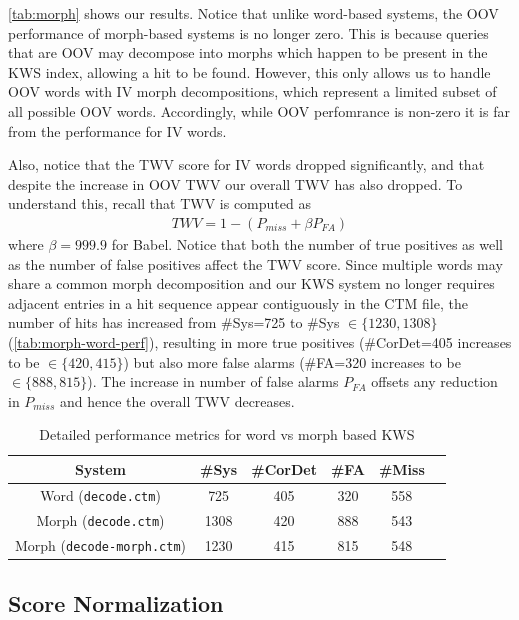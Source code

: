 \documentclass[a4paper,oneside,reqno]{amsart}
\begin{document}
\autoref{tab:morph} shows our results. Notice that unlike word-based systems,
the OOV performance of morph-based systems is no longer zero. This is because
queries that are OOV may decompose into morphs which happen to be present
in the KWS index, allowing a hit to be found. However, this only allows us to
handle OOV words with IV morph decompositions, which represent a limited subset
of all possible OOV words. Accordingly, while OOV perfomrance is non-zero it is
far from the performance for IV words.

Also, notice that the TWV score for IV words dropped significantly, and that
despite the increase in OOV TWV our overall TWV has also dropped. To understand
this, recall that TWV is computed as
\begin{align}
  \label{def:twv}
  TWV = 1 - (P_{miss} + \beta P_{FA})
\end{align}
where $\beta = 999.9$ for Babel. Notice that both the number of true positives
as well as the number of false positives affect the TWV score. Since multiple
words may share a common morph decomposition and our KWS system no longer
requires adjacent entries in a hit sequence appear contiguously in the CTM
file, the number of hits has increased from \#Sys=725 to \#Sys $\in \{1230,
1308\}$ (\autoref{tab:morph-word-perf}), resulting in more true positives
(\#CorDet=405 increases to be $\in \{420, 415\}$) but also more false alarms
(\#FA=320 increases to be $\in \{888, 815\}$). The increase in number of false
alarms $P_{FA}$ offsets any reduction in $P_{miss}$ and hence the overall TWV
decreases.

\begin{table}
  \begin{tabular}{cccccc}
    \toprule
    System                            & \#Sys & \#CorDet & \#FA & \#Miss\\
    \midrule
    Word (\texttt{decode.ctm})        & 725   & 405      & 320  & 558\\
    Morph (\texttt{decode.ctm})       & 1308  & 420      & 888  & 543\\
    Morph (\texttt{decode-morph.ctm}) & 1230  & 415      & 815  & 548\\
    \bottomrule
  \end{tabular}
  \caption{Detailed performance metrics for word vs morph based KWS}
  \label{tab:morph-word-perf}
\end{table}

\subsection{Score Normalization}
\end{document}
